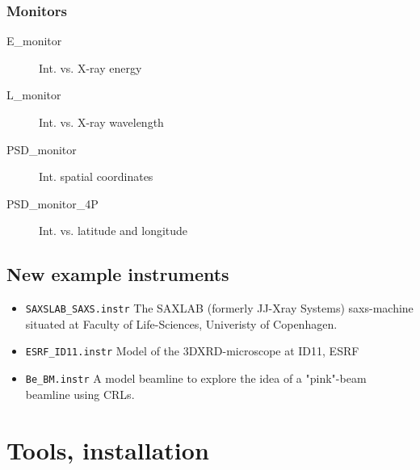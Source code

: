 \subsubsection*{Monitors}
\begin{description}
\item[E\_monitor] Int. vs. X-ray energy
\item[L\_monitor] Int. vs. X-ray wavelength
\item[PSD\_monitor] Int. spatial coordinates
\item[PSD\_monitor\_4P] Int. vs. latitude and longitude
\end{description}


\subsection{New example instruments}


\begin{itemize}
\item \verb+SAXSLAB_SAXS.instr+ The SAXLAB (formerly JJ-Xray Systems) saxs-machine situated at Faculty of Life-Sciences, Univeristy of Copenhagen. 
\item \verb+ESRF_ID11.instr+ Model of the 3DXRD-microscope at ID11, ESRF
\item \verb+Be_BM.instr+ A model beamline to explore the idea of a "pink"-beam beamline using CRLs\cite{vaughan_10}.
\end{itemize}


\section{Tools, installation}
\label{s:new-features:tools}
